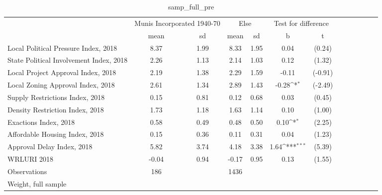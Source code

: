 \begin{table}[htbp]\centering
\def\sym#1{\ifmmode^{#1}\else\(^{#1}\)\fi}
\caption{samp\_full\_pre \label{tab1}}
\begin{tabular}{l*{3}{cccc}}
\toprule
                    &\multicolumn{2}{c}{Munis Incorporated 1940-70}&\multicolumn{2}{c}{Else} &\multicolumn{2}{c}{Test for difference}\\
                    &        mean&          sd&        mean&          sd&           b         &           t\\
\midrule
Local Political Pressure Index, 2018&        8.37&        1.99&        8.33&        1.95&        0.04         &      (0.24)\\
State Political Involvement Index, 2018&        2.26&        1.13&        2.14&        1.03&        0.12         &      (1.32)\\
Local Project Approval Index, 2018&        2.19&        1.38&        2.29&        1.59&       -0.11         &     (-0.91)\\
Local Zoning Approval Index, 2018&        2.61&        1.34&        2.89&        1.43&       -0.28\sym{*}  &     (-2.49)\\
Supply Restrictions Index, 2018&        0.15&        0.81&        0.12&        0.68&        0.03         &      (0.45)\\
Density Restriction Index, 2018&        1.73&        1.18&        1.63&        1.14&        0.10         &      (1.00)\\
Exactions Index, 2018&        0.58&        0.49&        0.48&        0.50&        0.10\sym{*}  &      (2.25)\\
Affordable Housing Index, 2018&        0.15&        0.36&        0.11&        0.31&        0.04         &      (1.23)\\
Approval Delay Index, 2018&        5.82&        3.74&        4.18&        3.38&        1.64\sym{***}&      (5.39)\\
WRLURI 2018         &       -0.04&        0.94&       -0.17&        0.95&        0.13         &      (1.55)\\
\midrule
Observations        &         186&            &        1436&            &                     &            \\
\bottomrule
\multicolumn{7}{l}{\footnotesize Weight, full sample}\\
\end{tabular}
\end{table}
